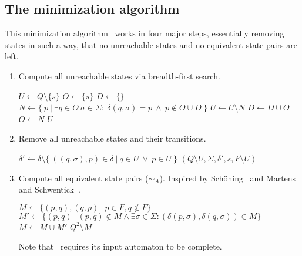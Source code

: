 \subsection{The minimization algorithm}

This minimization algorithm \MinAlg\ works in four major steps, essentially removing states in such a way, that no unreachable states and no equivalent state pairs are left.
\begin{enumerate}
	\item Compute all unreachable states via breadth-first search.
	
	\vspace{0.2cm}
	\begin{algorithmic}[1]
			\State $U \gets Q \setminus \{s\}$	
			\State $O \gets \{s\}$				
			\State $D \gets \{\}$				
				\State $N \gets \{\ p\ | \ \exists q \in O\ \sigma \in \Sigma \colon\ \delta(q, \sigma) = p\ \land\ p \notin O \cup D\ \}$
				\State $U \gets U \setminus N$
				\State $D \gets D \cup O$
				\State $O \gets N$
			\EndWhile
			\State \Return $U$
		\EndFunction
	\end{algorithmic}

	\item Remove all unreachable states and their transitions.
	
	\vspace{0.2cm}
	\begin{algorithmic}[1]
            \State $\delta' \gets \delta \setminus \{\ ((q,\sigma),p)\in\delta\ |\ q\in U\ \lor\ p\in U\ \}$
			\State \Return $(Q \setminus U, \Sigma, \delta', s, F \setminus U)$
		\EndFunction
	\end{algorithmic}

	\item Compute all equivalent state pairs ($\sim_A$). Inspired by Schöning~\cite[p. 46]{Sch01} and Martens and Schwentick~\cite[p. 17]{MS18}.
	\vspace{0.2cm}
	\begin{algorithmic}[1]
		 \label{ch:2:minmark}
		\State $M \gets \{ (p,q), (q,p)\ |\ p \in F, q \notin F \}$
		\Do
			\State $M' \gets \{ (p,q)\ |\ (p,q) \notin M \land \exists \sigma \in \Sigma \colon (\delta(p,\sigma), \delta(q,\sigma)) \in M \}$
			\State $M \gets M \cup M'$
		\State \Return $Q^2 \setminus M$
		\EndFunction
	\end{algorithmic}
	Note that \CompDist\ requires its input automaton to be complete. 


\end{enumerate}
